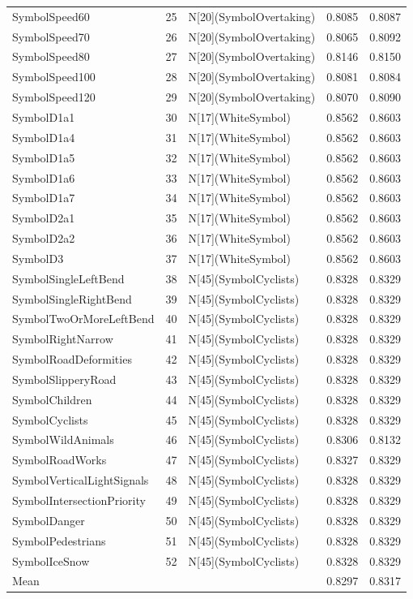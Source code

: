 \begin{tabular}{lllll}
SymbolSpeed60 & 25 & N[20](SymbolOvertaking) & 0.8085 & 0.8087 \\
SymbolSpeed70 & 26 & N[20](SymbolOvertaking) & 0.8065 & 0.8092 \\
SymbolSpeed80 & 27 & N[20](SymbolOvertaking) & 0.8146 & 0.8150 \\
SymbolSpeed100 & 28 & N[20](SymbolOvertaking) & 0.8081 & 0.8084 \\
SymbolSpeed120 & 29 & N[20](SymbolOvertaking) & 0.8070 & 0.8090 \\
SymbolD1a1 & 30 & N[17](WhiteSymbol) & 0.8562 & 0.8603 \\
SymbolD1a4 & 31 & N[17](WhiteSymbol) & 0.8562 & 0.8603 \\
SymbolD1a5 & 32 & N[17](WhiteSymbol) & 0.8562 & 0.8603 \\
SymbolD1a6 & 33 & N[17](WhiteSymbol) & 0.8562 & 0.8603 \\
SymbolD1a7 & 34 & N[17](WhiteSymbol) & 0.8562 & 0.8603 \\
SymbolD2a1 & 35 & N[17](WhiteSymbol) & 0.8562 & 0.8603 \\
SymbolD2a2 & 36 & N[17](WhiteSymbol) & 0.8562 & 0.8603 \\
SymbolD3 & 37 & N[17](WhiteSymbol) & 0.8562 & 0.8603 \\
SymbolSingleLeftBend & 38 & N[45](SymbolCyclists) & 0.8328 & 0.8329 \\
SymbolSingleRightBend & 39 & N[45](SymbolCyclists) & 0.8328 & 0.8329 \\
SymbolTwoOrMoreLeftBend & 40 & N[45](SymbolCyclists) & 0.8328 & 0.8329 \\
SymbolRightNarrow & 41 & N[45](SymbolCyclists) & 0.8328 & 0.8329 \\
SymbolRoadDeformities & 42 & N[45](SymbolCyclists) & 0.8328 & 0.8329 \\
SymbolSlipperyRoad & 43 & N[45](SymbolCyclists) & 0.8328 & 0.8329 \\
SymbolChildren & 44 & N[45](SymbolCyclists) & 0.8328 & 0.8329 \\
SymbolCyclists & 45 & N[45](SymbolCyclists) & 0.8328 & 0.8329 \\
SymbolWildAnimals & 46 & N[45](SymbolCyclists) & 0.8306 & 0.8132 \\
SymbolRoadWorks & 47 & N[45](SymbolCyclists) & 0.8327 & 0.8329 \\
SymbolVerticalLightSignals & 48 & N[45](SymbolCyclists) & 0.8328 & 0.8329 \\
SymbolIntersectionPriority & 49 & N[45](SymbolCyclists) & 0.8328 & 0.8329 \\
SymbolDanger & 50 & N[45](SymbolCyclists) & 0.8328 & 0.8329 \\
SymbolPedestrians & 51 & N[45](SymbolCyclists) & 0.8328 & 0.8329 \\
SymbolIceSnow & 52 & N[45](SymbolCyclists) & 0.8328 & 0.8329 \\
Mean &  &  & 0.8297 & 0.8317 \\
\bottomrule
\end{tabular}
